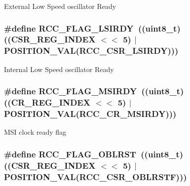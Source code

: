 External Low Speed oscillator Ready \hypertarget{group___r_c_c___flag_ga8c5e4992314d347597621bfe7ab10d72}{
\subsubsection[{R\-C\-C\-\_\-\-F\-L\-A\-G\-\_\-\-L\-S\-I\-R\-D\-Y}]{\setlength{\rightskip}{0pt plus 5cm}\#define R\-C\-C\-\_\-\-F\-L\-A\-G\-\_\-\-L\-S\-I\-R\-D\-Y~((uint8\-\_\-t)((C\-S\-R\-\_\-\-R\-E\-G\-\_\-\-I\-N\-D\-E\-X $<$$<$ 5) $\vert$ P\-O\-S\-I\-T\-I\-O\-N\-\_\-\-V\-A\-L({\bf R\-C\-C\-\_\-\-C\-S\-R\-\_\-\-L\-S\-I\-R\-D\-Y})))}}\label{group___r_c_c___flag_ga8c5e4992314d347597621bfe7ab10d72}
Internal Low Speed oscillator Ready \hypertarget{group___r_c_c___flag_ga62ed7a3bb53fc28801071a2ad0d4f1af}{
\subsubsection[{R\-C\-C\-\_\-\-F\-L\-A\-G\-\_\-\-M\-S\-I\-R\-D\-Y}]{\setlength{\rightskip}{0pt plus 5cm}\#define R\-C\-C\-\_\-\-F\-L\-A\-G\-\_\-\-M\-S\-I\-R\-D\-Y~((uint8\-\_\-t)((C\-R\-\_\-\-R\-E\-G\-\_\-\-I\-N\-D\-E\-X $<$$<$ 5) $\vert$ P\-O\-S\-I\-T\-I\-O\-N\-\_\-\-V\-A\-L({\bf R\-C\-C\-\_\-\-C\-R\-\_\-\-M\-S\-I\-R\-D\-Y})))}}\label{group___r_c_c___flag_ga62ed7a3bb53fc28801071a2ad0d4f1af}
M\-S\-I clock ready flag \hypertarget{group___r_c_c___flag_ga9bacaedece5c7cb6d9e52c1412e1a8ae}{
\subsubsection[{R\-C\-C\-\_\-\-F\-L\-A\-G\-\_\-\-O\-B\-L\-R\-S\-T}]{\setlength{\rightskip}{0pt plus 5cm}\#define R\-C\-C\-\_\-\-F\-L\-A\-G\-\_\-\-O\-B\-L\-R\-S\-T~((uint8\-\_\-t)((C\-S\-R\-\_\-\-R\-E\-G\-\_\-\-I\-N\-D\-E\-X $<$$<$ 5) $\vert$ P\-O\-S\-I\-T\-I\-O\-N\-\_\-\-V\-A\-L({\bf R\-C\-C\-\_\-\-C\-S\-R\-\_\-\-O\-B\-L\-R\-S\-T\-F})))}}\label{group___r_c_c___flag_ga9bacaedece5c7cb6d9e52c1412e1a8ae}
